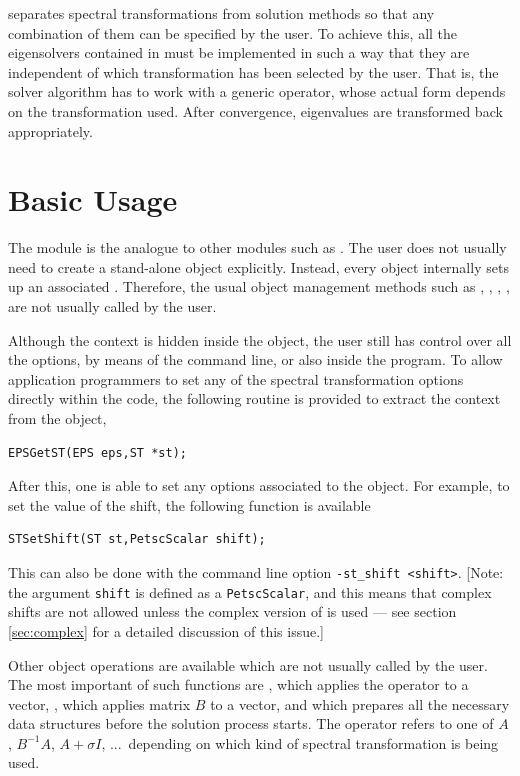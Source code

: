 	\slepc separates spectral transformations from solution methods so that any combination of them can be specified by the user. To achieve this, all the eigensolvers contained in  must be implemented in such a way that they are independent of which transformation has been selected by the user. That is, the solver algorithm has to work with a generic operator, whose actual form depends on the transformation used. After convergence, eigenvalues are transformed back appropriately. 

\section{Basic Usage}

	The  module is the analogue to other \petsc{} modules such as . 
	The user does not usually need to create a stand-alone  object explicitly. Instead, every  object internally sets up an associated . Therefore, the usual object management methods such as , , , , are not usually called by the user.

	Although the  context is hidden inside the  object, the user still has control over all the options, by means of the command line, or also inside the program. To allow application programmers to set any of the spectral transformation options directly within the code, the following routine is provided to extract the  context from the  object,
	\begin{Verbatim}[fontsize=\small]
	EPSGetST(EPS eps,ST *st);
	\end{Verbatim}
	
	After this, one is able to set any options associated to the  object. For example, to set the value of the shift, the following function is available
	\begin{Verbatim}[fontsize=\small]
	STSetShift(ST st,PetscScalar shift);
	\end{Verbatim}
	This can also be done with the command line option \Verb!-st_shift <shift>!. [Note: the argument \texttt{shift} is defined as a \texttt{PetscScalar}, and this means that complex shifts are not allowed unless the complex version of \slepc is used --- see section \ref{sec:complex} for a detailed discussion of this issue.]

	Other object operations are available which are not usually called by the user. The most important of such functions are , which applies the operator to a vector, , which applies matrix $B$ to a vector, and  which prepares all the necessary data structures before the solution process starts. The operator refers to one of $A$, $B^{-1}\!A$, $A+\sigma I$, ...\ depending on which kind of spectral transformation is being used.
 
